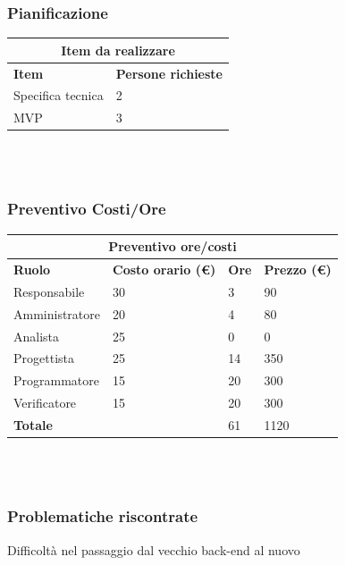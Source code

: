 \documentclass[9pt]{article}
\begin{document}
\subsubsection{Pianificazione}
\begin{center}
	\begin{tabularx}{\textwidth}{|X|X|}
		\hline
		\multicolumn{2}{|c|}{\textbf{Item da realizzare}}     \\
		\hline
		\hline
		\textbf{Item}            & \textbf{Persone richieste} \\
		\hline
		Specifica tecnica        	& 2                          \\
		\hline
		MVP        					& 3           \\
		\hline
	\end{tabularx}\\[8pt]
	\mbox{}\\
\end{center}
\subsubsection{Preventivo Costi/Ore}
\begin{center}
	\begin{tabularx}{\textwidth}{|X|X|X|X|}
		\hline
		\multicolumn{4}{|c|}{\textbf{Preventivo ore/costi}}                                      \\
		\hline
		\hline
		\textbf{Ruolo}  & \textbf{Costo orario (\euro)} & \textbf{Ore} & \textbf{Prezzo (\euro)} \\
		\hline									
		Responsabile    &	30		&	3		&	90		\\
		\hline									
		Amministratore  &	20		&	4		&	80		\\
		\hline									
		Analista        &	25		&	0		&	0		\\
		\hline									
		Progettista     &	25		&	14		&	350		\\
		\hline									
		Programmatore   &	15		&	20		&	300		\\
		\hline									
		Verificatore    &	15		&	20		&	300		\\
		\hline									
		\textbf{Totale} &			&	61		&	1120		\\
		\hline																								
	\end{tabularx}\\[8pt]
	\mbox{}\\
\end{center}
\subsubsection{Problematiche riscontrate}
Difficoltà nel passaggio dal vecchio back-end al nuovo 
\end{document}
